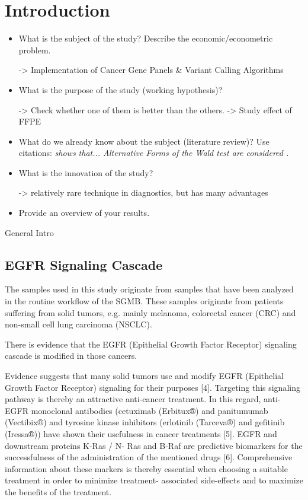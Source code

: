 \section{Introduction}

\begin{itemize}

\item What is the subject of the study? Describe the
economic/econometric problem.

-> Implementation of Cancer Gene Panels & Variant Calling Algorithms

\item What is the purpose of the study (working hypothesis)?

-> Check whether one of them is better than the others.
-> Study effect of FFPE

\item What do we already know about the subject (literature
review)? Use citations: {\it \citet{mutect:2013} shows that...
Alternative Forms of the Wald test are considered
\citep{Breusch&Schmidt:88}.}

\item What is the innovation of the study?

-> relatively rare technique in diagnostics, but has many advantages

\item Provide an overview of your results.


\end{itemize}

General Intro

\subsection{EGFR Signaling Cascade}

The samples used in this study originate from samples that have been analyzed in
the routine workflow of the SGMB. These samples originate from patients suffering
from solid tumors, e.g. mainly melanoma, colorectal cancer (CRC) and non-small cell
lung carcinoma (NSCLC).

There is evidence that the EGFR (Epithelial Growth Factor Receptor) signaling
cascade is modified in those cancers.

Evidence suggests that many solid tumors use and modify EGFR (Epithelial
Growth Factor Receptor) signaling for their purposes [4]. Targeting this
signaling pathway is thereby an attractive anti-cancer treatment. In this
regard, anti-EGFR monoclonal antibodies (cetuximab (Erbitux®) and panitumumab
(Vectibix®) and tyrosine kinase inhibitors (erlotinib (Tarceva®) and gefitinib
(Iressa®)) have shown their usefulness in cancer treatments [5]. EGFR and
downstream proteins K-Ras / N- Ras and B-Raf are predictive biomarkers for the
successfulness of the administration of the mentioned drugs [6]. Comprehensive
information about these markers is thereby essential when choosing a suitable
treatment in order to minimize treatment- associated side-effects and to
maximize the benefits of the treatment.

